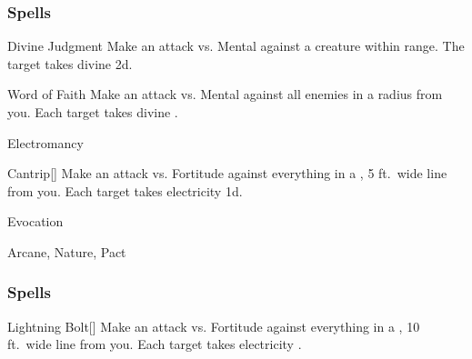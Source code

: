 \subsubsection{Spells}


\begin{ability}[\nth{1}]{Divine Judgment}
Make an attack vs. Mental against a creature within \rngmed range.
\hit The target takes divine  \plus2d.
\end{ability}
\vspace{0.25em}



\begin{ability}[\nth{2}]{Word of Faith}
Make an attack vs. Mental against all enemies in a \areamed radius from you.
\hit Each target takes divine .
\end{ability}
\vspace{0.25em}


\newpage
\begin{spellsection}{Electromancy}

\begin{spellheader}
\end{spellheader}


\begin{ability}{Cantrip}[]
Make an attack vs. Fortitude against everything in a \areamed, 5 ft.\ wide line from you.
\hit Each target takes electricity  \minus1d.
\end{ability}




 Evocation

 Arcane, Nature, Pact
\end{spellsection}


\subsubsection{Spells}


\begin{ability}[\nth{1}]{Lightning Bolt}[]
Make an attack vs. Fortitude against everything in a \arealarge, 10 ft.\ wide line from you.
\hit Each target takes electricity .
\end{ability}
\vspace{0.25em}



